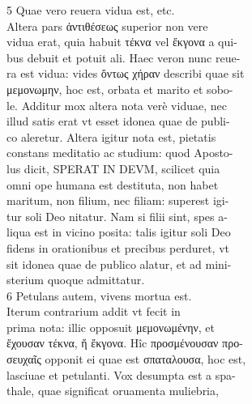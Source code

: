\documentclass{article}
\begin{document}
\begin{pages}
                5 Quae vero reuera vidua est, etc. \\
                Altera pars ἀντιθέσεως superior non vere \\
                vidua erat, quia habuit τέκνα vel ἔκγονα a qui- \\
                bus debuit et potuit ali. Haec veron nunc reue- \\
                ra est vidua: vides ὄντως χήραν describi quae sit \\
                μεμονωμην, hoc est, orbata et marito et sobo- \\
                le. Additur mox altera nota verè viduae, nec \\
                illud satis erat vt esset idonea quae de publi- \\
                co aleretur. Altera igitur nota est, pietatis \\
                constans meditatio ac studium: quod Aposto- \\
                lus dicit, SPERAT IN DEVM, scilicet quia \\
                omni ope humana est destituta, non habet \\
                maritum, non filium, nec filiam: superest igi- \\
                tur soli Deo nitatur. Nam si filii sint, spes a- \\
                liqua est in vicino posita: talis igitur soli Deo \\
                fidens in orationibus et precibus perduret, vt \\
                sit idonea quae de publico alatur, et ad mini- \\
                sterium quoque admittatur. \\
                6 Petulans autem, vivens mortua est. \\
                Iterum contrarium addit vt fecit in \\
                prima nota: illic opposuit μεμονωμένην, et \\
                ἔχουσαν τέκνα, ἤ ἔκγονα.  Hîc προσμένουσαν προ- \\
                σευχαῖς opponit ei quae est σπαταλουσα, hoc est, \\
                lasciuae et petulanti. Vox desumpta est a spa- \\
                thale, quae significat oruamenta muliebria, \\

\end{pages}
\end{document}
